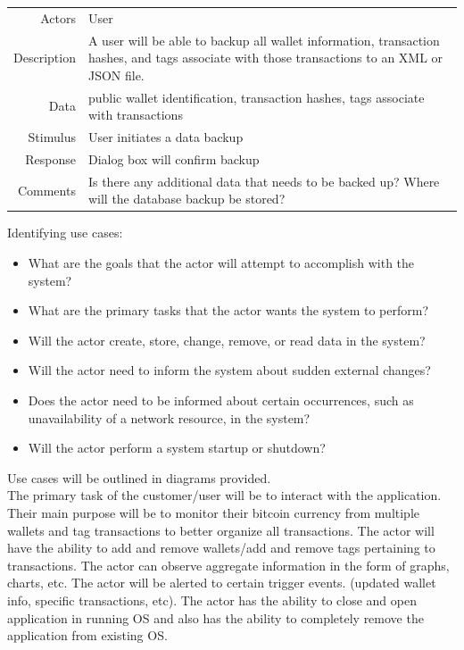 \begin{table}[H]
  \tabulinesep=1.2mm
      \begin{tabu}{r | X}
        \rowfont{\color{black}}
        \\
        \hline
        \textsf{Actors} & User\\
        Description & A user will be able to backup all wallet information, transaction hashes, and tags associate with those transactions to an XML or JSON file.\\
        Data & public wallet identification, transaction hashes, tags associate with transactions\\
        Stimulus & User initiates a data backup\\
        Response & Dialog box will confirm backup\\
        Comments & Is there any additional data that needs to be backed up? Where will the database backup be stored?\\
      \end{tabu}
    \end{table}


Identifying use cases:\\
\begin{itemize}
\item What are the goals that the actor will attempt to accomplish with the system?
\item What are the primary tasks that the actor wants the system to perform?
\item Will the actor create, store, change, remove, or read data in the system?
\item Will the actor need to inform the system about sudden external changes?
\item Does the actor need to be informed about certain occurrences, such as unavailability of a network resource, in the system?
\item Will the actor perform a system startup or shutdown?
\end{itemize}

Use cases will be outlined in diagrams provided.\\ 

The primary task of the customer/user will be to interact with the application.  Their main purpose will be to monitor their bitcoin currency from multiple wallets and tag transactions to better organize all transactions.  The actor will have the ability to add and remove wallets/add and remove tags pertaining to transactions. The actor can observe aggregate information in the form of graphs, charts, etc.  The actor will be alerted to certain trigger events. (updated wallet info, specific transactions, etc).  The actor has the ability to close and open application in running OS and also has the ability to completely remove the application from existing OS. \\
	
